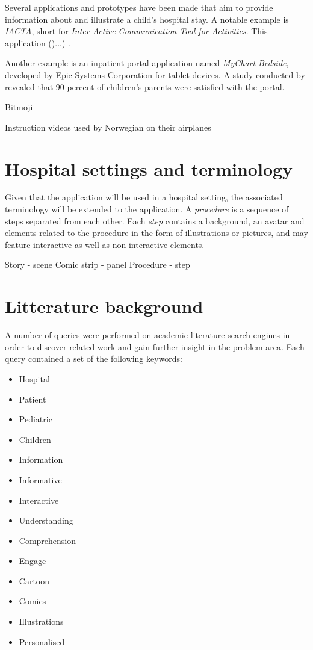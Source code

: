 Several applications and prototypes have been made that aim to provide information about and illustrate a child's hospital stay. A notable example is \emph{IACTA}, short for \emph{Inter-Active Communication Tool for Activities}. This application ()...) \parencite{stalberg2018}.

Another example is an inpatient portal application named \emph{MyChart Bedside}, developed by Epic Systems Corporation for tablet devices. A study conducted by \textcite{kelly2017} revealed that 90 percent of children's parents were satisfied with the portal. 

Bitmoji

Instruction videos used by Norwegian on their airplanes

\section{Hospital settings and terminology}
\label{sec:medicterminology}

Given that the application will be used in a hospital setting, the associated terminology will be extended to the application. A \emph{procedure} is a sequence of steps separated from each other. Each \emph{step} contains a background, an avatar and elements related to the procedure in the form of illustrations or pictures, and may feature interactive as well as non-interactive elements.

Story - scene
Comic strip - panel
Procedure - step

\section{Litterature background}

A number of queries were performed on academic literature search engines in order to discover related work and gain further insight in the problem area. Each query contained a set of the following keywords:

\begin{multicols}{3}
    \raggedcolumns
    \begin{itemize}
        \item Hospital
        \item Patient
        \item Pediatric
        \item Children
        \item Information
        \item Informative
        \item Interactive
        \item Understanding
        \item Comprehension
        \item Engage
        \item Cartoon
        \item Comics
        \item Illustrations
        \item Personalised
    \end{itemize}
\end{multicols}

